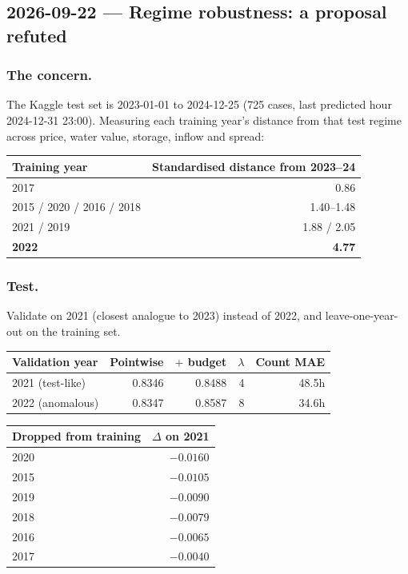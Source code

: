 \subsection{2026-09-22 --- Regime robustness: a proposal refuted}
\label{sec:robustness}

\subsubsection*{The concern.} The Kaggle test set is 2023-01-01 to 2024-12-25 (725 cases, last
predicted hour 2024-12-31 23:00). Measuring each training year's distance from that test regime
across price, water value, storage, inflow and spread:

\begin{center}
\begin{tabular}{lr}
\toprule
Training year & Standardised distance from 2023--24 \\
\midrule
2017 & 0.86 \\
2015 / 2020 / 2016 / 2018 & 1.40--1.48 \\
2021 / 2019 & 1.88 / 2.05 \\
\textbf{2022} & \textbf{4.77} \\
\bottomrule
\end{tabular}
\end{center}


\subsubsection*{Test.} Validate on 2021 (closest analogue to 2023) instead of 2022, and
leave-one-year-out on the training set.

\begin{center}
\begin{tabular}{lrrrr}
\toprule
Validation year & Pointwise & $+$ budget & $\lambda$ & Count MAE \\
\midrule
2021 (test-like) & 0.8346 & 0.8488 & 4 & 48.5h \\
2022 (anomalous) & 0.8347 & 0.8587 & 8 & 34.6h \\
\bottomrule
\end{tabular}
\qquad
\begin{tabular}{lr}
\toprule
Dropped from training & $\Delta$ on 2021 \\
\midrule
2020 & $-0.0160$ \\
2015 & $-0.0105$ \\
2019 & $-0.0090$ \\
2018 & $-0.0079$ \\
2016 & $-0.0065$ \\
2017 & $-0.0040$ \\
\bottomrule
\end{tabular}
\end{center}

